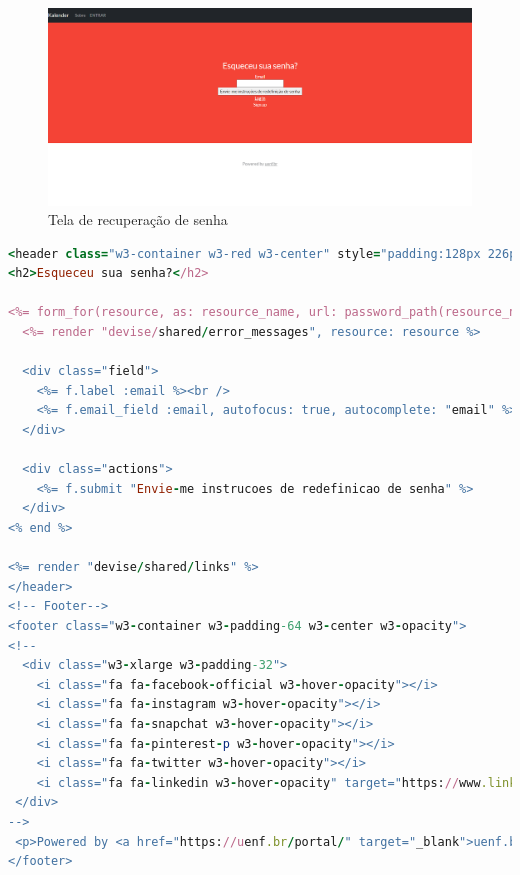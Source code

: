 \begin{itemize}
        \begin{figure}[H]
          \begin{center}
            \includegraphics[width=12cm]{Pictures/interface/recuperar.png}
            \caption{Tela de recuperação de senha} \label{recuperar}
          \end{center}
        \end{figure}
        \begin{lstlisting}[language=Ruby, caption=Recuperação de senha]
          <header class="w3-container w3-red w3-center" style="padding:128px 226px">
<h2>Esqueceu sua senha?</h2>

<%= form_for(resource, as: resource_name, url: password_path(resource_name), html: { method: :post }) do |f| %>
  <%= render "devise/shared/error_messages", resource: resource %>

  <div class="field">
    <%= f.label :email %><br />
    <%= f.email_field :email, autofocus: true, autocomplete: "email" %>
  </div>

  <div class="actions">
    <%= f.submit "Envie-me instrucoes de redefinicao de senha" %>
  </div>
<% end %>

<%= render "devise/shared/links" %>
</header>
<!-- Footer-->
<footer class="w3-container w3-padding-64 w3-center w3-opacity">
<!--
  <div class="w3-xlarge w3-padding-32">
    <i class="fa fa-facebook-official w3-hover-opacity"></i>
    <i class="fa fa-instagram w3-hover-opacity"></i>
    <i class="fa fa-snapchat w3-hover-opacity"></i>
    <i class="fa fa-pinterest-p w3-hover-opacity"></i>
    <i class="fa fa-twitter w3-hover-opacity"></i>
    <i class="fa fa-linkedin w3-hover-opacity" target="https://www.linkedin.com/in/arretdaniel/">uenf</i>
 </div>
-->
 <p>Powered by <a href="https://uenf.br/portal/" target="_blank">uenf.br</a></p>
</footer>

        \end{lstlisting}


\end{itemize}
